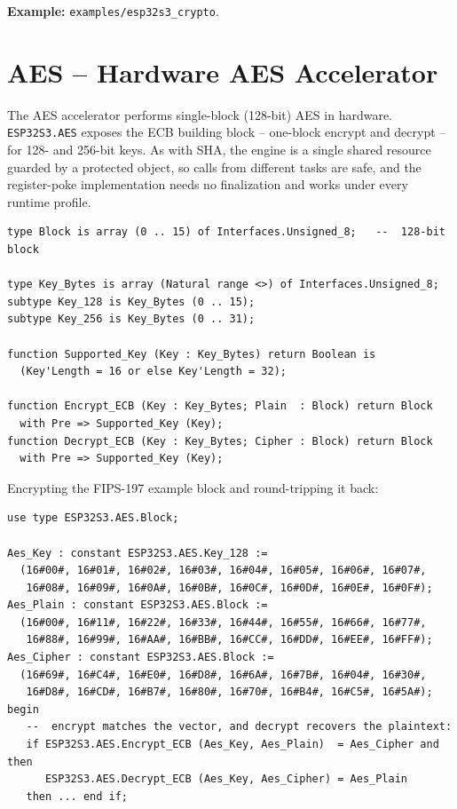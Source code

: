 \noindent\textbf{Example:} \texttt{examples/esp32s3\_crypto}.

\section{AES -- Hardware AES Accelerator}
\label{app:int:aes}

The AES accelerator performs single-block (128-bit) AES in hardware.
\texttt{ESP32S3.AES} exposes the ECB building block -- one-block encrypt and
decrypt -- for 128- and 256-bit keys. As with SHA, the engine is a single shared
resource guarded by a protected object, so calls from different tasks are safe,
and the register-poke implementation needs no finalization and works under every
runtime profile.


\begin{lstlisting}
type Block is array (0 .. 15) of Interfaces.Unsigned_8;   --  128-bit block

type Key_Bytes is array (Natural range <>) of Interfaces.Unsigned_8;
subtype Key_128 is Key_Bytes (0 .. 15);
subtype Key_256 is Key_Bytes (0 .. 31);

function Supported_Key (Key : Key_Bytes) return Boolean is
  (Key'Length = 16 or else Key'Length = 32);

function Encrypt_ECB (Key : Key_Bytes; Plain  : Block) return Block
  with Pre => Supported_Key (Key);
function Decrypt_ECB (Key : Key_Bytes; Cipher : Block) return Block
  with Pre => Supported_Key (Key);
\end{lstlisting}

Encrypting the FIPS-197 example block and round-tripping it back:

\begin{lstlisting}
use type ESP32S3.AES.Block;

Aes_Key : constant ESP32S3.AES.Key_128 :=
  (16#00#, 16#01#, 16#02#, 16#03#, 16#04#, 16#05#, 16#06#, 16#07#,
   16#08#, 16#09#, 16#0A#, 16#0B#, 16#0C#, 16#0D#, 16#0E#, 16#0F#);
Aes_Plain : constant ESP32S3.AES.Block :=
  (16#00#, 16#11#, 16#22#, 16#33#, 16#44#, 16#55#, 16#66#, 16#77#,
   16#88#, 16#99#, 16#AA#, 16#BB#, 16#CC#, 16#DD#, 16#EE#, 16#FF#);
Aes_Cipher : constant ESP32S3.AES.Block :=
  (16#69#, 16#C4#, 16#E0#, 16#D8#, 16#6A#, 16#7B#, 16#04#, 16#30#,
   16#D8#, 16#CD#, 16#B7#, 16#80#, 16#70#, 16#B4#, 16#C5#, 16#5A#);
begin
   --  encrypt matches the vector, and decrypt recovers the plaintext:
   if ESP32S3.AES.Encrypt_ECB (Aes_Key, Aes_Plain)  = Aes_Cipher and then
      ESP32S3.AES.Decrypt_ECB (Aes_Key, Aes_Cipher) = Aes_Plain
   then ... end if;
\end{lstlisting}

